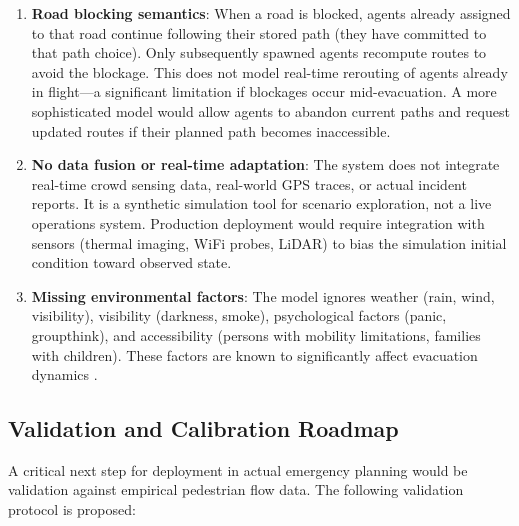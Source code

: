 \documentclass[conference]{IEEEtran}
\begin{document}
\begin{enumerate}
\item \textbf{Road blocking semantics}: When a road is blocked, agents already assigned to that road continue following their stored path (they have committed to that path choice). Only subsequently spawned agents recompute routes to avoid the blockage. This does not model real-time rerouting of agents already in flight—a significant limitation if blockages occur mid-evacuation. A more sophisticated model would allow agents to abandon current paths and request updated routes if their planned path becomes inaccessible.

\item \textbf{No data fusion or real-time adaptation}: The system does not integrate real-time crowd sensing data, real-world GPS traces, or actual incident reports. It is a synthetic simulation tool for scenario exploration, not a live operations system. Production deployment would require integration with sensors (thermal imaging, WiFi probes, LiDAR) to bias the simulation initial condition toward observed state.

\item \textbf{Missing environmental factors}: The model ignores weather (rain, wind, visibility), visibility (darkness, smoke), psychological factors (panic, groupthink), and accessibility (persons with mobility limitations, families with children). These factors are known to significantly affect evacuation dynamics \cite{duives2015agent}.
\end{enumerate}

\subsection{Validation and Calibration Roadmap}

A critical next step for deployment in actual emergency planning would be validation against empirical pedestrian flow data. The following validation protocol is proposed:
\end{document}
